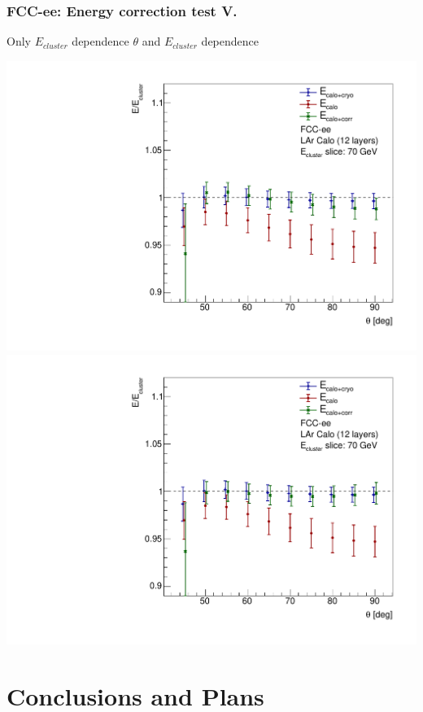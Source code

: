\documentclass[aspectratio=169]{beamer}
\begin{document}
\begin{frame}
  \frametitle{FCC-ee: Energy correction test V.}

  \centering
  Only $E_{cluster}$ dependence \hspace{30mm}
  $\theta$ and $E_{cluster}$ dependence \\[1.5ex]
  \begin{adjustwidth}{-5mm}{-5mm}
    \includegraphics[width=0.49\linewidth]{figures/2d/graph_test_summary_mean_theta_70gev_1d.pdf}
    \includegraphics[width=0.49\linewidth]{figures/2d/graph_test_summary_mean_theta_70gev.pdf}
  \end{adjustwidth}
\end{frame}


\section{Conclusions and Plans}
\end{document}

